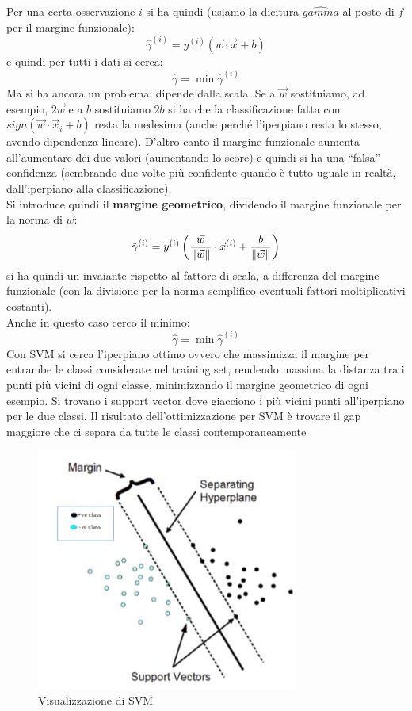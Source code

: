 \documentclass[a4paper,12pt, oneside]{book}
\begin{document}
Per una certa osservazione $i$ si ha quindi (usiamo la dicitura $\hat{gamma}$ al
posto di $f$ per il margine funzionale):
\[\hat{\gamma}^{(i)}=y^{(i)}(\vec{w}\cdot\vec{x}+b)\]
e quindi per tutti i dati si cerca:
\[\hat{\gamma}=\min \hat{\gamma}^{(i)}\]
Ma si ha ancora un problema: dipende dalla scala. Se a $\vec{w}$ sostituiamo,
ad esempio, $2\vec{w}$ e a $b$ sostituiamo $2b$ si ha che la classificazione
fatta con $sign(\vec{w}\cdot\vec{x}_i+b)$ resta la medesima (anche perché
l'iperpiano resta lo stesso, avendo dipendenza lineare). D'altro canto il
margine funzionale aumenta all'aumentare dei due valori (aumentando lo score) e
quindi si ha una ``falsa'' confidenza (sembrando due volte più confidente quando
è tutto uguale in realtà, dall'iperpiano alla classificazione).\\
Si introduce quindi il \textbf{margine geometrico}, dividendo il margine
funzionale per la norma di $\vec{w}$:
\[\hat{\gamma}^{(i)}=y^{(i)}\left(\frac{\vec{w}}{\norm{\vec{w}}}
    \cdot\vec{x}^{(i)}+\frac{b}{\norm{\vec{w}}}\right)\]
si ha quindi un invaiante rispetto al fattore di scala, a differenza del margine
funzionale (con la divisione per la norma semplifico eventuali fattori
moltiplicativi costanti).\\
Anche in questo caso cerco il minimo:
\[\hat{\gamma}=\min \hat{\gamma}^{(i)}\]
Con SVM si cerca l'iperpiano ottimo ovvero che massimizza il margine per
entrambe le classi considerate nel training set, rendendo massima la distanza
tra i punti più vicini di ogni classe, minimizzando il margine geometrico di
ogni esempio. Si trovano i support vector dove giacciono i più vicini punti
all'iperpiano per le due classi. Il risultato dell'ottimizzazione per SVM è
trovare il gap maggiore che ci separa da tutte le classi contemporaneamente
\begin{figure}[H]
  \centering
  \includegraphics[scale = 0.7]{img/svm.jpg}
  \caption{Visualizzazione di SVM}
  \label{fig:svm}
\end{figure}
\end{document}
